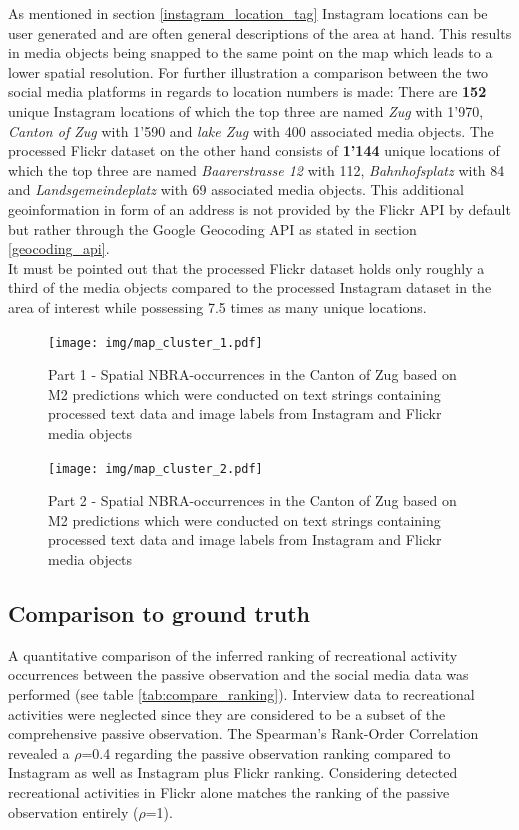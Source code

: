 As mentioned in section \ref{instagram_location_tag} Instagram locations can be user generated and are often general descriptions of the area at hand. This results in media objects being snapped to the same point on the map which leads to a lower spatial resolution. For further illustration a comparison between the two social media platforms in regards to location numbers is made:
There are \textbf{152} unique Instagram locations of which the top three are named \textit{Zug} with 1'970, \textit{Canton of Zug} with 1'590 and \textit{lake Zug} with 400 associated media objects.
The processed Flickr dataset on the other hand consists of \textbf{1'144} unique locations of which the top three are named \textit{Baarerstrasse 12} with 112, \textit{Bahnhofsplatz} with 84 and \textit{Landsgemeindeplatz} with 69 associated media objects. This additional geoinformation in form of an address is not provided by the Flickr API by default but rather through the Google Geocoding API as stated in section \ref{geocoding_api}. \\
It must be pointed out that the processed Flickr dataset holds only roughly a third of the media objects compared to the processed Instagram dataset in the area of interest while possessing 7.5 times as many unique locations. 

\begin{figure}[!htb]
   \centering
   \texttt{[image: img/map\_cluster\_1.pdf]}
   \caption{Part 1 - Spatial NBRA-occurrences in the Canton of Zug based on M2 predictions which were conducted on text strings containing processed text data and image labels from Instagram and Flickr media objects}
   \label{fig:map_cluster_1}
\end{figure}

\begin{figure}[!htb]
   \centering
   \texttt{[image: img/map\_cluster\_2.pdf]}
   \caption{Part 2 - Spatial NBRA-occurrences in the Canton of Zug based on M2 predictions which were conducted on text strings containing processed text data and image labels from Instagram and Flickr media objects}
   \label{fig:map_cluster_2}
\end{figure}

\subsection{Comparison to ground truth} \label{results_comp_ground_truth}
A quantitative comparison of the inferred ranking of recreational activity occurrences between the passive observation and the social media data was performed (see table \ref{tab:compare_ranking}). Interview data to recreational activities were neglected since they are considered to be a subset of the comprehensive passive observation. The Spearman's Rank-Order Correlation revealed a $\rho$=0.4 regarding the passive observation ranking compared to Instagram as well as Instagram plus Flickr ranking. Considering detected recreational activities in Flickr alone matches the ranking of the passive observation entirely ($\rho$=1).

